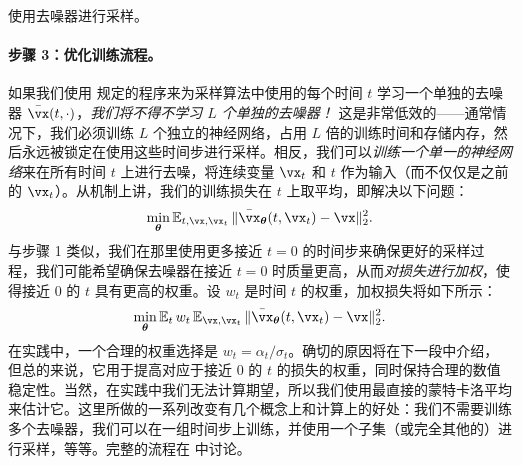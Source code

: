 \documentclass[../../book-main.tex]{subfiles}
\begin{document}
\begin{algorithm}
	\caption{使用去噪器进行采样。}
	\label{alg:iterative_denoising}
	\begin{algorithmic}[1]
		 
		\EndFor
		\EndFunction
	\end{algorithmic}
\end{algorithm}

\paragraph{步骤 3：优化训练流程。} 如果我们使用  规定的程序来为采样算法中使用的每个时间 \(t\) 学习一个单独的去噪器 \(\bar{\vx}(t, \cdot)\)，\textit{我们将不得不学习 \(L\) 个单独的去噪器！} 这是非常低效的——通常情况下，我们必须训练 \(L\) 个独立的神经网络，占用 \(L\) 倍的训练时间和存储内存，然后永远被锁定在使用这些时间步进行采样。相反，我们可以\textit{训练一个单一的神经网络}来在所有时间 \(t\) 上进行去噪，将连续变量 \(\vx_{t}\) 和 \(t\) 作为输入（而不仅仅是之前的 \(\vx_{t}\)）。从机制上讲，我们的训练损失在 \(t\) 上取平均，即解决以下问题：
\begin{equation}
	\min_{\bm\theta}\Ex_{t, \vx, \vx_{t}}\norm{\bar{\vx}_{\bm\theta}(t, \vx_{t}) - \vx}_{2}^{2}.
\end{equation}
与步骤 1 类似，我们在那里使用更多接近 \(t = 0\) 的时间步来确保更好的采样过程，我们可能希望确保去噪器在接近 \(t = 0\) 时质量更高，从而\textit{对损失进行加权}，使得接近 \(0\) 的 \(t\) 具有更高的权重。设 \(w_{t}\) 是时间 \(t\) 的权重，加权损失将如下所示：
\begin{equation}\label{eq:parametric_denoising_loss}
	\min_{\bm\theta}\Ex_{t}w_{t}\Ex_{\vx, \vx_{t}}\norm{\bar{\vx}_{\bm\theta}(t, \vx_{t}) - \vx}_{2}^{2}.
\end{equation}
在实践中，一个合理的权重选择是 \(w_{t} = \alpha_{t}/\sigma_{t}\)。确切的原因将在下一段中介绍，但总的来说，它用于提高对应于接近 \(0\) 的 \(t\) 的损失的权重，同时保持合理的数值稳定性。当然，在实践中我们无法计算期望，所以我们使用最直接的蒙特卡洛平均来估计它。这里所做的一系列改变有几个概念上和计算上的好处：我们不需要训练多个去噪器，我们可以在一组时间步上训练，并使用一个子集（或完全其他的）进行采样，等等。完整的流程在  中讨论。
\end{document}
